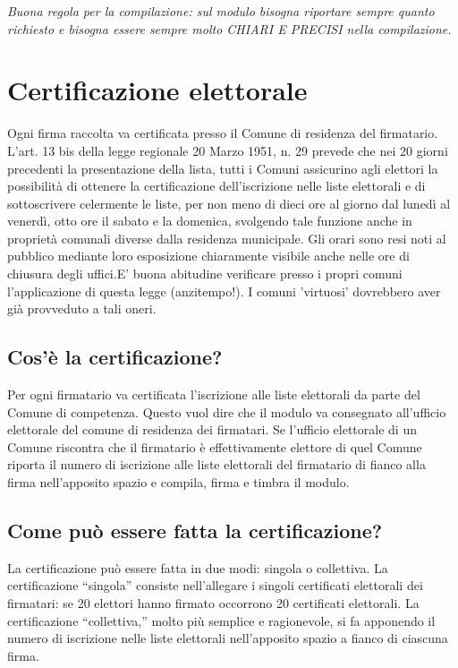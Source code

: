 \documentclass[paper=a4,11pt]{scrartcl}
\begin{document}
\emph{Buona regola per la compilazione: sul modulo bisogna riportare sempre quanto richiesto e bisogna essere sempre molto CHIARI E PRECISI nella compilazione.}

\section{Certificazione elettorale}
Ogni firma raccolta va certificata presso il Comune di residenza del 
firmatario. L'art. 13 bis della legge
regionale 20 Marzo 1951, n. 29 prevede che nei 20 giorni precedenti la 
presentazione della lista, tutti i Comuni assicurino agli elettori la 
possibilità di ottenere la certificazione dell’iscrizione nelle liste 
elettorali e di sottoscrivere celermente
le liste, per non meno di dieci ore al giorno dal lunedì al venerdì, otto 
ore il sabato e la domenica, svolgendo tale funzione anche in proprietà 
comunali diverse dalla residenza municipale.
Gli orari sono resi noti al pubblico mediante loro esposizione chiaramente 
visibile anche nelle ore di chiusura degli uffici.E' buona abitudine verificare 
presso i propri comuni l'applicazione di questa legge (anzitempo!). I comuni 
'virtuosi' dovrebbero aver già provveduto a tali oneri.

\subsection{Cos’è la certificazione?}
Per ogni firmatario va certificata l’iscrizione alle liste elettorali da parte 
del Comune di competenza.
Questo vuol dire che il modulo va consegnato all’ufficio elettorale del comune 
di residenza dei firmatari.
Se l’ufficio elettorale di un Comune riscontra che il firmatario è 
effettivamente elettore di quel Comune riporta il numero di iscrizione alle 
liste elettorali del firmatario di fianco alla firma nell’apposito spazio e 
compila, firma e timbra il modulo.

\subsection{Come può essere fatta la certificazione?}
La certificazione può essere fatta in due modi: singola o collettiva. La 
certificazione ``singola'' consiste nell'allegare i singoli certificati 
elettorali dei firmatari: se 20 elettori hanno firmato occorrono 20 certificati 
elettorali. La certificazione ``collettiva,'' molto più semplice e ragionevole, 
si fa apponendo il numero di iscrizione nelle liste elettorali nell'apposito 
spazio a fianco di ciascuna firma.
\end{document}
